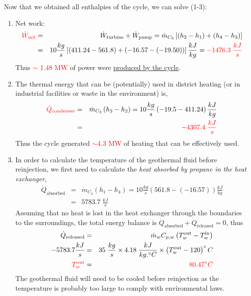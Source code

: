 \documentclass[12pts,a4paper,amsmath,amssymb,floatfix]{article}%
\newcommand{\frc}{\displaystyle\frac}
\newcommand{\red}{\textcolor{red}}
\begin{document}
Now that we obtained all enthalpies of the cycle, we can solve (1-3):
\begin{enumerate}
%
\item Net work:
\begin{eqnarray}
\red{\dot{W}_{\text{net}}} &=& \dot{W}_{\text{turbine}} + \dot{W}_{\text{pump}} = \dot{m}_{C_{3}}\left[\left(h_{2}-h_{1}\right) + \left(h_{4}-h_{3}\right)\right] \nonumber \\
                        &=& 10\frc{kg}{s}\left[\left(411.24-561.8\right) + \left(-16.57-(-19.50)\right)\right]\frc{kJ}{kg} = \red{-1476.3\;\frc{kJ}{s}} \nonumber
\end{eqnarray}
Thus \red{$\sim$ 1.48 MW} of power were \underline{produced by the cycle}.
%
\item The thermal energy that can be (potentially) used in district heating (or in industrial facilities or waste in the environment) is,
\begin{eqnarray}
 \red{\dot{Q}_{\text{condenser}}} &=& \dot{m}_{C_{3}}\left(h_{3}-h_{2}\right) = 10\frc{kg}{s}\left(-19.5-411.24\right)\frc{kJ}{kg} \nonumber \\
                             &=& \red{-4307.4\;\frc{kJ}{s}} \nonumber
\end{eqnarray}
Thus the cycle generated \red{$\sim$4.3 MW} of heating that can be effectively used.
%

\item In order to calculate the temperature of the geothermal fluid before reinjection, we first need to calculate the {\it heat absorbed by propane in the heat exchanger},
\begin{eqnarray}
\dot{Q}_{\text{absorbed}} &=& \dot{m}_{C_{3}}\left(h_{1}-h_{4}\right) = 10\frc{kg}{s}\left(561.8-(-16.57)\right)\frc{kJ}{kg} \nonumber \\
                      &=& 5783.7\; \frc{kJ}{s} \nonumber 
\end{eqnarray}
Assuming that no heat is lost in the heat exchanger through the boundaries to the surroundings, the total energy balance is $\dot{Q}_{\text{absorbed}}+\dot{Q}_{\text{released}} = 0$, thus
\begin{eqnarray}
 \dot{Q}_{\text{released}} &=& \dot{m}_{w}C_{p,w}\left(T_{w}^{\text{out}}-T_{w}^{\text{in}}\right) \nonumber \\
 -5783.7 \frc{kJ}{s}    &=& 35\;\frc{kg}{s} \times 4.18\;\frc{kJ}{kg.^{\circ}C}\times \left(T_{w}^{\text{out}}-120\right)^{\circ}C \nonumber \\
 \red{T_{w}^{\text{out}}}   &=& \red{80.47^{\circ}C} \nonumber
\end{eqnarray}
The geothermal fluid will need to be cooled before reinjection as the temperature is probably too large to comply with environmental laws.   
%
\end{enumerate} 



%
\end{document}
